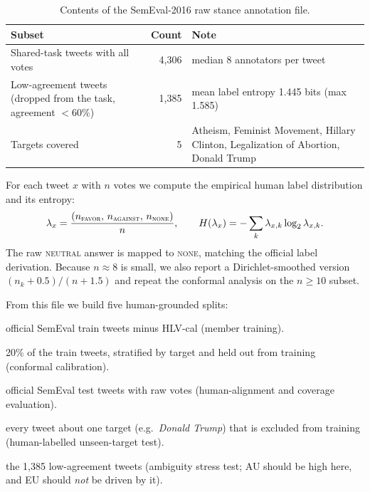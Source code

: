 \documentclass[11pt,a4paper]{article}
\begin{document}
\begin{table}[ht]
\centering
\small
\begin{tabular}{p{5.4cm} r p{6.4cm}}
\toprule
Subset & Count & Note \\
\midrule
Shared-task tweets with all votes & 4{,}306 & median 8 annotators per tweet \\
Low-agreement tweets (dropped from the task, agreement $<60\%$) & 1{,}385 & mean label entropy 1.445 bits (max 1.585) \\
Targets covered & 5 & Atheism, Feminist Movement, Hillary Clinton, Legalization of Abortion, Donald Trump \\
\bottomrule
\end{tabular}
\caption{Contents of the SemEval-2016 raw stance annotation file.}
\label{tab:raw}
\end{table}

For each tweet $x$ with $n$ votes we compute the empirical human label distribution and
its entropy:
\begin{equation}
  \lambda_x = \frac{(n_{\textsc{favor}},\, n_{\textsc{against}},\, n_{\textsc{none}})}{n},
  \qquad
  H(\lambda_x) = -\sum_k \lambda_{x,k} \log_2 \lambda_{x,k}.
\end{equation}
The raw \textsc{neutral} answer is mapped to \textsc{none}, matching the official label
derivation. Because $n \approx 8$ is small, we also report a Dirichlet-smoothed version
$(n_k + 0.5)/(n + 1.5)$ and repeat the conformal analysis on the $n \ge 10$ subset.

From this file we build five human-grounded splits:
\begin{description}[leftmargin=2.3cm, style=nextline]
  \item[HLV-train] official SemEval train tweets minus HLV-cal (member training).
  \item[HLV-cal] 20\% of the train tweets, stratified by target and held out from training
  (conformal calibration).
  \item[HLV-test] official SemEval test tweets with raw votes (human-alignment and coverage
  evaluation).
  \item[HLV-unseen] every tweet about one target (e.g.\ \emph{Donald Trump}) that is
  excluded from training (human-labelled unseen-target test).
  \item[HLV-ambig] the 1{,}385 low-agreement tweets (ambiguity stress test; AU should be
  high here, and EU should \emph{not} be driven by it).
\end{description}
\end{document}

